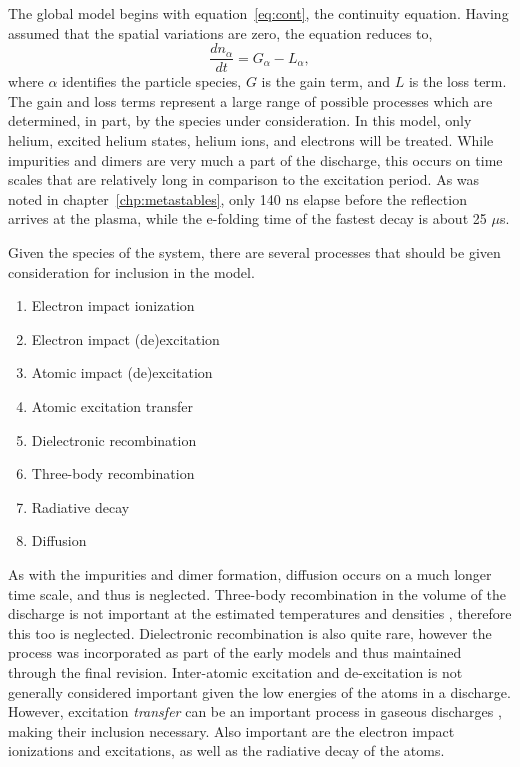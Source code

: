 The global model begins with equation~\ref{eq:cont}, the continuity equation.
Having assumed that the spatial variations are zero, the equation reduces to,
\begin{equation}
  \frac{d n_\alpha}{dt} = G_\alpha - L_\alpha,
  \label{eq:zdmcont}
\end{equation}
where $\alpha$ identifies the particle species, $G$ is the gain term, and $L$ is
the loss term. The gain and loss terms represent a large range of possible
processes which are determined, in part, by the species under consideration. In
this model, only helium, excited helium states, helium ions, and electrons will
be treated. While impurities and dimers are very much a part of the discharge,
this occurs on time scales that are relatively long in comparison to the
excitation period. As was noted in chapter~\ref{chp:metastables}, only 140 ns
elapse before the reflection arrives at the plasma, while the e-folding time of
the fastest decay is about 25 $\mu$s.

Given the species of the system, there are several processes that should be
given consideration for inclusion in the model.
\begin{enumerate}
  \item Electron impact ionization 
  \item Electron impact (de)excitation 
  \item Atomic impact (de)excitation
  \item Atomic excitation transfer
  \item Dielectronic recombination
  \item Three-body recombination
  \item Radiative decay
  \item Diffusion
\end{enumerate}
As with the impurities and dimer formation, diffusion occurs on a much longer
time scale, and thus is neglected. Three-body recombination in the volume of the
discharge is not important at the estimated temperatures and densities
\cite{Lieberman2005}, therefore this too is neglected. Dielectronic
recombination is also quite rare, however the process was incorporated as part
of the early models and thus maintained through the final revision. Inter-atomic
excitation and de-excitation is not generally considered important given the low
energies of the atoms in a discharge. However, excitation \emph{transfer} can be
an important process in gaseous discharges \cite{Lieberman2005}, making their
inclusion necessary. Also important are the electron impact ionizations and
excitations, as well as the radiative decay of the atoms.

